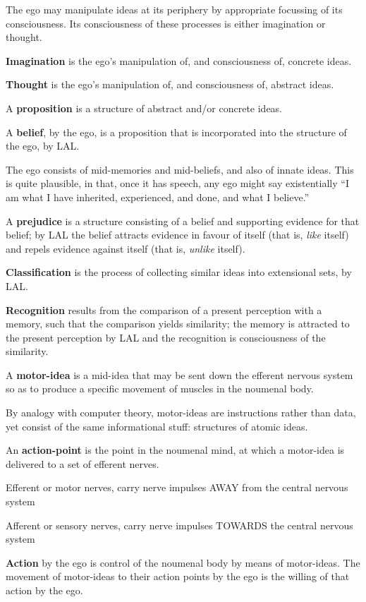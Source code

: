 \documentclass[11pt]{article}
\begin{document}
{{The ego may manipulate ideas at its periphery by appropriate
focussing of its consciousness. Its consciousness of these
processes is either imagination or thought.

\textbf{Imagination} is the ego's manipulation of, and consciousness of,
concrete ideas.

\textbf{Thought} is the ego's manipulation of, and consciousness
of, abstract ideas.

A \textbf{proposition} is a structure of abstract and/or concrete
ideas.

A \textbf{belief}, by the ego, is a proposition that is incorporated
into the structure of the ego, by LAL.

The ego consists of mid-memories and mid-beliefs, and also
of innate ideas. This is quite plausible, in that, once it
has speech, any ego might say existentially ``I am what I
have inherited, experienced, and done, and what I believe.''

A \textbf{prejudice} is a structure consisting of a belief and
supporting evidence for that belief; by LAL the belief
attracts evidence in favour of itself (that is, \emph{like}
itself) and repels evidence against itself (that is,
\emph{unlike} itself).

\textbf{Classification} is the process of collecting similar ideas
into extensional sets, by LAL.

\textbf{Recognition} results from the comparison of a present
perception with a memory, such that the comparison yields
similarity; the memory is attracted to the present perception
by LAL and the recognition is consciousness of the similarity.

A \textbf{motor-idea} is a mid-idea that may be sent down the
efferent nervous system so as to produce a specific movement
of muscles in the noumenal body.

By analogy with computer theory, motor-ideas are instructions
rather than data, yet consist of the same informational
stuff: structures of atomic ideas.

An \textbf{action-point} is the point in the noumenal mind,
at which a motor-idea is delivered to a set of efferent
nerves.

Efferent or motor nerves, carry nerve impulses AWAY from the central nervous system

Afferent or sensory nerves, carry nerve impulses TOWARDS the central nervous system

\textbf{Action} by the ego is control of the noumenal body by means
of motor-ideas. The movement of motor-ideas to their action
points by the ego is the willing of that action by the ego.

}}
\end{document}
